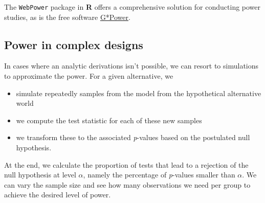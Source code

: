 \documentclass[
  11pt,
  letterpaper,
]{scrbook}
\providecommand{\tightlist}{%
  \setlength{\itemsep}{0pt}\setlength{\parskip}{0pt}}\usepackage{longtable,booktabs,array}
\theoremstyle{definition}
\theoremstyle{remark}
\begin{document}
The \texttt{WebPower} package in \textbf{R} offers a comprehensive
solution for conducting power studies, as is the free software
\href{https://www.psychologie.hhu.de/arbeitsgruppen/allgemeine-psychologie-und-arbeitspsychologie/gpower}{G*Power}.

\hypertarget{power-in-complex-designs}{%
\subsection{Power in complex designs}\label{power-in-complex-designs}}

In cases where an analytic derivations isn't possible, we can resort to
simulations to approximate the power. For a given alternative, we

\begin{itemize}
\tightlist
\item
  simulate repeatedly samples from the model from the hypothetical
  alternative world
\item
  we compute the test statistic for each of these new samples
\item
  we transform these to the associated \emph{p}-values based on the
  postulated null hypothesis.
\end{itemize}

At the end, we calculate the proportion of tests that lead to a
rejection of the null hypothesis at level \(\alpha\), namely the
percentage of \emph{p}-values smaller than \(\alpha\). We can vary the
sample size and see how many observations we need per group to achieve
the desired level of power.
\end{document}
